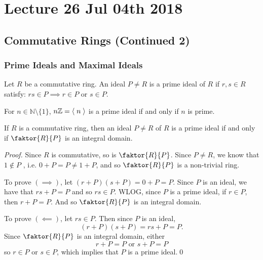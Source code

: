 \chapter{Lecture 26 Jul 04th 2018}%
\label{chp:lecture_26_jul_04th_2018}

\section{Commutative Rings (Continued 2)}%
\label{sec:commutative_rings_continued_2}

\subsection{Prime Ideals and Maximal Ideals}%
\label{sub:prime_ideals_and_maximal_ideals}

\begin{defn}
\label{defn:prime_ideals}
  Let $R$ be a commutative ring. An ideal $P \neq R$ is a prime ideal of $R$ if $r, s \in R$ satisfy: $rs \in P \implies r \in P$ or $s \in P$.
\end{defn}

\begin{eg}
  For $n \in \mathbb{N} \setminus \{1\}$, $n \mathbb{Z} = \langle \; n \; \rangle$ is a prime ideal if and only if $n$ is prime.
\end{eg}

\begin{propo}
\label{propo:ideal_is_prime_iff_quotient_of_ring_by_ideal_is_an_integral_domain}
If $R$ is a commutative ring, then an ideal $P \neq R$ of $R$ is a prime ideal if and only if $\faktor{R}{P}$ is an integral domain.
\end{propo}

\begin{proof}
  Since $R$ is commutative, so is $\faktor{R}{P}$. Since $P \neq R$, we know that $1 \notin P$ , i.e. $0 + P = P \neq 1 + P$, and so $\faktor{R}{P}$ is a non-trivial ring.

  \noindent To prove $(\implies)$, let $(r + P)(s + P) = 0 + P = P$. Since $P$ is an ideal, we have that $rs + P = P$ and so $rs \in P$. WLOG, since $P$ is a prime ideal, if $r \in P$, then $r + P = P$. And so $\faktor{R}{P}$ is an integral domain.

  \noindent To prove $(\impliedby)$, let $rs \in P$. Then since $P$ is an ideal,
  \begin{equation*}
    (r + P)(s + P) = rs + P = P.
  \end{equation*}
  Since $\faktor{R}{P}$ is an integral domain, either
  \begin{equation*}
    r + P = P \text{ or } s + P = P
  \end{equation*}
  so $r \in P$ or $s \in P$, which implies that $P$ is a prime ideal.\qed
\end{proof}

